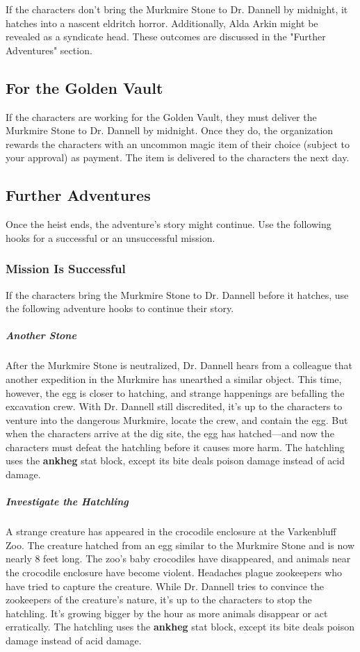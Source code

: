 \documentclass[10pt,a4paper,twoside,bg=print,twocolumn,openany,nodeprecatedcode]{dndbook}
\begin{document}
If the characters don't bring the Murkmire Stone to Dr. Dannell by midnight, it hatches into a nascent eldritch horror. Additionally, Alda Arkin might be revealed as a syndicate head. These outcomes are discussed in the "Further Adventures" section.

\subsection{For the Golden Vault}
If the characters are working for the Golden Vault, they must deliver the Murkmire Stone to Dr. Dannell by midnight. Once they do, the organization rewards the characters with an uncommon magic item of their choice (subject to your approval) as payment. The item is delivered to the characters the next day.

\subsection{Further Adventures}
Once the heist ends, the adventure's story might continue. Use the following hooks for a successful or an unsuccessful mission.

\subsubsection{Mission Is Successful}
If the characters bring the Murkmire Stone to Dr. Dannell before it hatches, use the following adventure hooks to continue their story.

\subparagraph{Another Stone}
After the Murkmire Stone is neutralized, Dr. Dannell hears from a colleague that another expedition in the Murkmire has unearthed a similar object. This time, however, the egg is closer to hatching, and strange happenings are befalling the excavation crew. With Dr. Dannell still discredited, it's up to the characters to venture into the dangerous Murkmire, locate the crew, and contain the egg. But when the characters arrive at the dig site, the egg has hatched—and now the characters must defeat the hatchling before it causes more harm. The hatchling uses the \textbf{ankheg} stat block, except its bite deals poison damage instead of acid damage.

\subparagraph{Investigate the Hatchling}
A strange creature has appeared in the crocodile enclosure at the Varkenbluff Zoo. The creature hatched from an egg similar to the Murkmire Stone and is now nearly 8 feet long. The zoo's baby crocodiles have disappeared, and animals near the crocodile enclosure have become violent. Headaches plague zookeepers who have tried to capture the creature. While Dr. Dannell tries to convince the zookeepers of the creature's nature, it's up to the characters to stop the hatchling. It's growing bigger by the hour as more animals disappear or act erratically. The hatchling uses the \textbf{ankheg} stat block, except its bite deals poison damage instead of acid damage.
\end{document}
